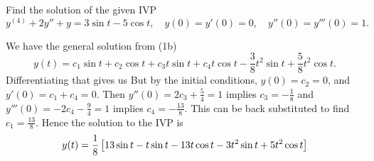 Find the solution of the given IVP 
$$y^{(4)} + 2y'' + y = 3 \sin t - 5 \cos t, \quad y(0) = y'(0) = 0, \quad y''(0) = y'''(0) = 1.$$

\soln We have the general solution from (1b)
$$y(t) = c_1 \sin t + c_2 \cos t + c_3 t \sin t + c_4 t \cos t - \frac38 t^2 \sin t + \frac58 t^2 \cos t.$$
Differentiating that gives us 
But by the initial conditions, $y(0) = c_2 = 0$, and $y'(0) = c_1 + c_4 = 0$. Then $y''(0) = 2c_3 + \frac54 = 1$ implies $c_3 = -\frac18$ and $y'''(0) = -2c_4 - \frac94 = 1$ implies $c_4 = -\frac{13}{8}$. This can be back substituted to find $c_1 = \frac{13}{8}$. Hence the solution to the IVP is 
$$y(t) = \frac18 \brac{13 \sin t - t \sin t - 13 t \cos t  - 3 t^2 \sin t + 5 t^2 \cos t}$$